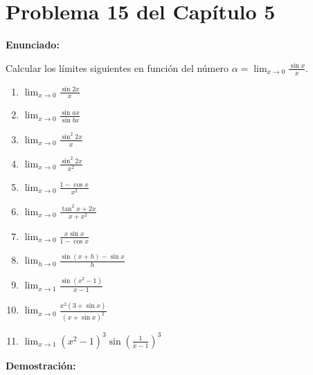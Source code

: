\section*{Problema 15 del Capítulo 5}

\textbf{Enunciado:}

Calcular los límites siguientes en función del número $\alpha = \lim_{x \to 0} \frac{\sin x}{x}$.

\begin{enumerate}
    \item $\lim_{x \to 0} \frac{\sin 2x}{x}$
    \item $\lim_{x \to 0} \frac{\sin ax}{\sin bx}$
    \item $\lim_{x \to 0} \frac{\sin^2 2x}{x}$
    \item $\lim_{x \to 0} \frac{\sin^2 2x}{x^2}$
    \item $\lim_{x \to 0} \frac{1 - \cos x}{x^2}$
    \item $\lim_{x \to 0} \frac{\tan^2 x + 2x}{x + x^2}$
    \item $\lim_{x \to 0} \frac{x \sin x}{1 - \cos x}$
    \item $\lim_{h \to 0} \frac{\sin(x + h) - \sin x}{h}$
    \item $\lim_{x \to 1} \frac{\sin(x^2 - 1)}{x - 1}$
    \item $\lim_{x \to 0} \frac{x^2(3 + \sin x)}{(x + \sin x)^2}$
    \item $\lim_{x \to 1} (x^2 - 1)^3 \sin\left(\frac{1}{x - 1}\right)^3$
\end{enumerate}

\textbf{Demostración:}

